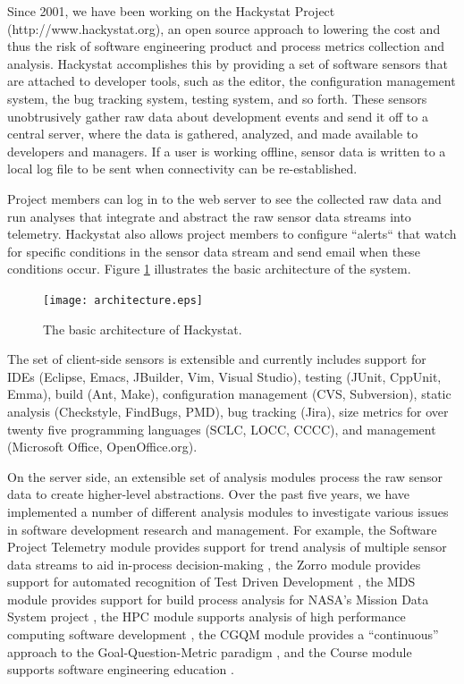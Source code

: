 \documentclass[12pt]{article}
\begin{document}
Since 2001, we have been working on the Hackystat Project
(http://www.hackystat.org), an open source approach to lowering
the cost and thus the risk of software engineering product and process
metrics collection and analysis.  Hackystat accomplishes this by providing
a set of software sensors that are attached to developer tools, such as the
editor, the configuration management system, the bug tracking system,
testing system, and so forth.  These sensors unobtrusively gather raw data
about development events and send it off to a central server, where the
data is gathered, analyzed, and made available to developers and managers.
If a user is working offline, sensor data is written to a local log file to
be sent when connectivity can be re-established.

Project members can log in to the web server to see the collected
raw data and run analyses that integrate and abstract the raw sensor
data streams into telemetry.  Hackystat also allows project members to
configure ``alerts`` that watch for specific conditions in the
sensor data stream and send email when these conditions occur. Figure
\ref{fig:architecture} illustrates the basic architecture of the system. 

\begin{figure}[ht]
  \centering
  \texttt{[image: architecture.eps]}
  \caption{The basic architecture of Hackystat.}
  \label{fig:architecture}
\end{figure}

The set of client-side sensors is extensible and currently includes support
for IDEs (Eclipse, Emacs, JBuilder, Vim, Visual Studio), testing (JUnit,
CppUnit, Emma), build (Ant, Make), configuration management (CVS,
Subversion), static analysis (Checkstyle, FindBugs, PMD), bug tracking
(Jira), size metrics for over twenty five programming languages (SCLC,
LOCC, CCCC), and management (Microsoft Office, OpenOffice.org).

On the server side, an extensible set of analysis modules process the raw
sensor data to create higher-level abstractions.  Over the past five years,
we have implemented a number of different analysis modules to investigate
various issues in software development research and management.  For
example, the Software Project Telemetry module provides support for trend
analysis of multiple sensor data streams to aid in-process decision-making
\cite{csdl2-04-11}, the Zorro module provides support for automated
recognition of Test Driven Development \cite{csdl2-06-02}, the MDS module
provides support for build process analysis for NASA's Mission Data System
project \cite{csdl2-03-07}, the HPC module supports analysis of high
performance computing software development \cite{csdl2-04-22}, the CGQM
module provides a ``continuous'' approach to the Goal-Question-Metric
paradigm \cite{csdl2-05-09}, and the Course module supports software
engineering education \cite{csdl2-03-12}.
\end{document}
